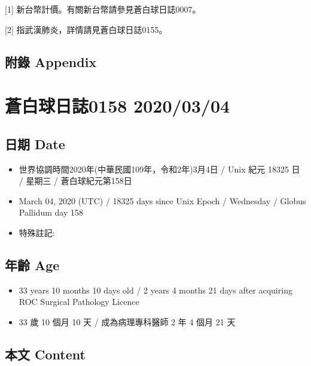 \documentclass[a5paper, 12pt
]{book}
\providecommand{\tightlist}{%
  \setlength{\itemsep}{0pt}\setlength{\parskip}{0pt}}
\begin{document}
{[}1{]} 新台幣計價。有關新台幣請參見蒼白球日誌0007。

{[}2{]} 指武漢肺炎，詳情請見蒼白球日誌0155。

\hypertarget{ux9644ux9304-appendix-2}{%
\subsection{附錄 Appendix}\label{ux9644ux9304-appendix-2}}

\hypertarget{ux84bcux767dux7403ux65e5ux8a8c0158-20200304}{%
\section{蒼白球日誌0158
2020/03/04}\label{ux84bcux767dux7403ux65e5ux8a8c0158-20200304}}

\hypertarget{ux65e5ux671f-date-3}{%
\subsection{日期 Date}\label{ux65e5ux671f-date-3}}

\begin{itemize}
\tightlist
\item
  世界協調時間2020年(中華民國109年，令和2年)3月4日 / Unix 紀元 18325 日
  / 星期三 / 蒼白球紀元第158日
\item
  March 04, 2020 (UTC) / 18325 days since Unix Epoch / Wednesday /
  Globus Pallidum day 158
\item
  特殊註記:
\end{itemize}

\hypertarget{ux5e74ux9f61-age-3}{%
\subsection{年齡 Age}\label{ux5e74ux9f61-age-3}}

\begin{itemize}
\tightlist
\item
  33 years 10 months 10 days old / 2 years 4 months 21 days after
  acquiring ROC Surgical Pathology Licence
\item
  33 歲 10 個月 10 天 / 成為病理專科醫師 2 年 4 個月 21 天
\end{itemize}

\hypertarget{ux672cux6587-content-3}{%
\subsection{本文 Content}\label{ux672cux6587-content-3}}
\end{document}

